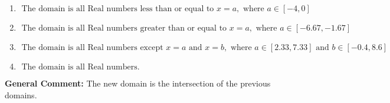 \documentclass{extbook}[14pt]
\begin{document}
\begin{enumerate}
{\begin{enumerate}[label=\Alph*.]
\item \( \text{ The domain is all Real numbers less than or equal to } x = a, \text{ where } a \in [-4, 0] \)


\item \( \text{ The domain is all Real numbers greater than or equal to } x = a, \text{ where } a \in [-6.67, -1.67] \)


\item \( \text{ The domain is all Real numbers except } x = a \text{ and } x = b, \text{ where } a \in [2.33, 7.33] \text{ and } b \in [-0.4, 8.6] \)


\item \( \text{ The domain is all Real numbers. } \)


\end{enumerate}

\textbf{General Comment:} The new domain is the intersection of the previous domains.
}
\end{enumerate}
\end{document}
